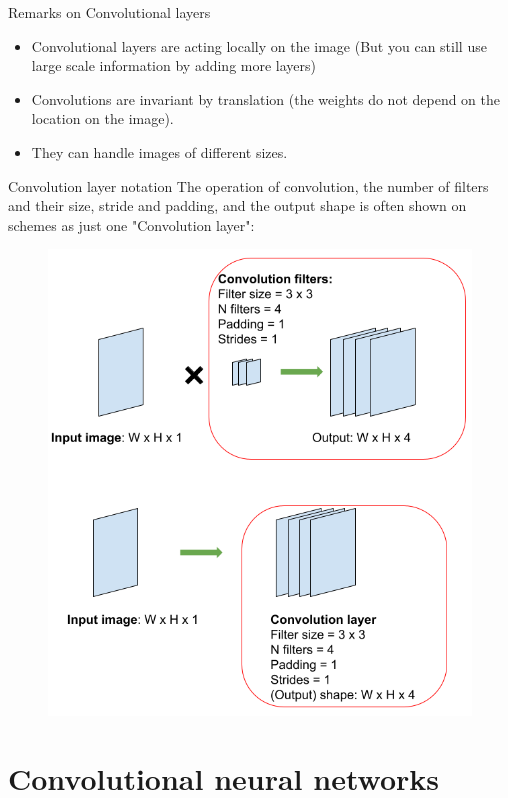 \documentclass[handout]{beamer}
\begin{document}
\begin{frame}{Remarks on Convolutional layers}
\begin{itemize}
    \item Convolutional layers are acting locally on the image (But you can still use large scale information by adding more layers)
    \item Convolutions are invariant by translation (the weights do not depend on the location on the image).
    \item They can handle images of different sizes.
    
\end{itemize}
\end{frame}

\begin{frame}{Convolution layer notation}
    The operation of convolution, the number of filters and their size, stride and padding, and the output shape is often shown on schemes as just one "Convolution layer":  
    \begin{figure}
   \centering
    \includegraphics[width=.5\textwidth]{fig/L2/Convolutional_layer_structure_conventions.png}
\end{figure}
\end{frame}

\section{Convolutional neural networks}
\end{document}

